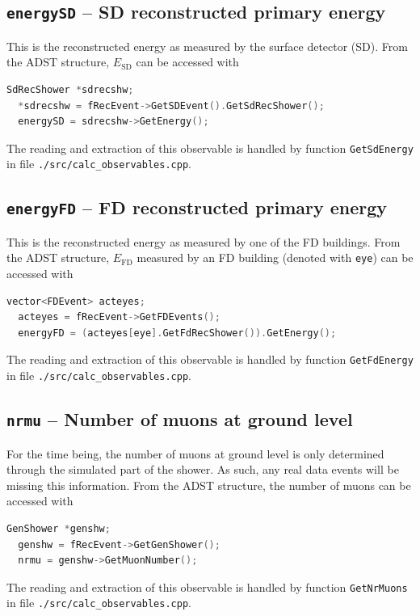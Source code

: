 \documentclass[12pt,a4paper]{report}
\begin{document}
\subsection{\texttt{energySD} -- SD reconstructed primary energy}
This is the reconstructed energy as measured by the surface detector (SD). From the ADST structure, $E_{\textrm{SD}}$ can be accessed with
\begin{lstlisting}[language=C++]
  SdRecShower *sdrecshw;
  *sdrecshw = fRecEvent->GetSDEvent().GetSdRecShower();
  energySD = sdrecshw->GetEnergy();
\end{lstlisting}
The reading and extraction of this observable is handled by function \texttt{GetSdEnergy} in file \texttt{./src/calc\_observables.cpp}.

\subsection{\texttt{energyFD} -- FD reconstructed primary energy}
This is the reconstructed energy as measured by one of the FD buildings. From the ADST structure, $E_{\textrm{FD}}$ measured by an FD building (denoted with \texttt{eye}) can be accessed with
\begin{lstlisting}[language=C++]
  vector<FDEvent> acteyes;
  acteyes = fRecEvent->GetFDEvents();
  energyFD = (acteyes[eye].GetFdRecShower()).GetEnergy();
\end{lstlisting}
The reading and extraction of this observable is handled by function \texttt{GetFdEnergy} in file \texttt{./src/calc\_observables.cpp}.

\subsection{\texttt{nrmu} -- Number of muons at ground level}
For the time being, the number of muons at ground level is only determined through the simulated part of the shower. As such, any real data events will be missing this information. From the ADST structure, the number of muons can be accessed with
\begin{lstlisting}[language=C++]
  GenShower *genshw;
  genshw = fRecEvent->GetGenShower();
  nrmu = genshw->GetMuonNumber();
\end{lstlisting}
The reading and extraction of this observable is handled by function \texttt{GetNrMuons} in file \texttt{./src/calc\_observables.cpp}.
\end{document}
